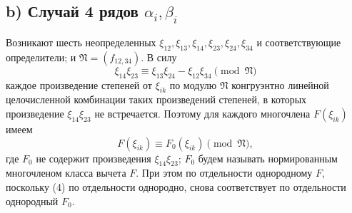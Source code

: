 \documentclass[11pt]{article}
\providecommand{\frN}{\mathfrak N}
\begin{document}
\subsection*{b) Случай 4 рядов \(\alpha_i,\beta_i\)}

Возникают шесть неопределенных \(\xi_{12},\xi_{13},\xi_{14},\xi_{23},\xi_{24},\xi_{34}\) и соответствующие определители; и \(\frN=(f_{12,34})\). В силу
\begin{equation}
        \xi_{14}\xi_{23}\equiv \xi_{13}\xi_{24}-\xi_{12}\xi_{34}\pmod{\frN}
\end{equation}
каждое произведение степеней от \(\xi_{ik}\) по модулю \(\frN\) конгруэнтно линейной целочисленной комбинации таких произведений степеней, в которых произведение \(\xi_{14}\xi_{23}\) не встречается. Поэтому для каждого многочлена \(F(\xi_{ik})\) имеем
\begin{equation}
        F(\xi_{ik})\equiv F_0(\xi_{ik})\pmod{\frN},
\end{equation}
где \(F_0\) не содержит произведения \(\xi_{14}\xi_{23}\); \(F_0\) будем называть нормированным многочленом класса вычета \(F\). При этом по отдельности однородному \(F\), поскольку (4) по отдельности однородно, снова соответствует по отдельности однородный \(F_0\).
\end{document}
